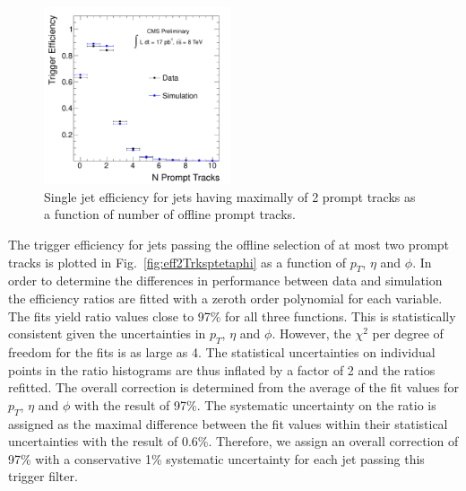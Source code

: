 \begin{figure}[htbp]
\centering
 \includegraphics[width=0.49\textwidth]{plots/trigger/effHT300_2Trk_NPromptTracks.pdf}
\caption{Single jet efficiency for jets having maximally of 2 prompt tracks as a function of number of offline prompt tracks. \label{fig:eff2Trks}}
\end{figure}

The trigger efficiency for jets passing the offline selection of at most two prompt tracks 
is plotted in Fig.~\ref{fig:eff2Trksptetaphi}
 as a function of $p_T$, $\eta$ and $\phi$. In order to determine the differences in performance 
between data and simulation the efficiency ratios are fitted with a zeroth order polynomial for each variable.
The fits yield ratio values close to 97\% for all three functions. This is statistically consistent given the uncertainties in $p_T$, $\eta$ and $\phi$.
 However, the $\chi^2$ per degree of freedom for the fits is as large as 4. 
The statistical uncertainties on individual points in the ratio histograms
are thus inflated by a factor of 2 and the ratios refitted.
 The overall correction is determined from the average of the fit values for
$p_T$, $\eta$ and $\phi$ with the result of 97\%. The systematic uncertainty on the ratio 
is assigned as the maximal
difference between the fit values within their statistical uncertainties with the result of 0.6\%.
Therefore, we assign an overall correction of 97\% with a conservative 1\% systematic uncertainty for 
each jet passing this trigger filter. 
 
